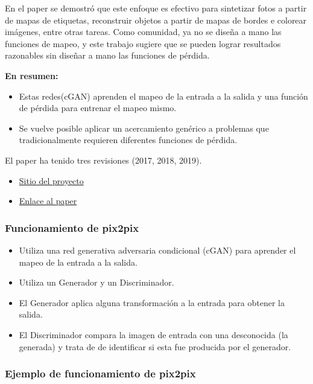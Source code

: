 \documentclass[10pt,journal,compsoc]{IEEEtran}\usepackage[T1]{fontenc}                              %
\begin{document}
En el paper se demostró que este enfoque es efectivo para sintetizar
fotos a partir de mapas de etiquetas, reconstruir objetos a partir de
mapas de bordes e colorear imágenes, entre otras tareas. Como comunidad,
ya no se diseña a mano las funciones de mapeo, y este trabajo sugiere
que se pueden lograr resultados razonables sin diseñar a mano las
funciones de pérdida.

\textbf{En resumen:}

\begin{itemize}
\item
  Estas redes(cGAN) aprenden el mapeo de la entrada a la salida y una
  función de pérdida para entrenar el mapeo mismo.
\item
  Se vuelve posible aplicar un acercamiento genérico a problemas que
  tradicionalmente requieren diferentes funciones de pérdida.
\end{itemize}

El paper ha tenido tres revisiones (2017, 2018, 2019).

\begin{itemize}
\item \href{https://phillipi.github.io/pix2pix/}{Sitio del proyecto}
\item \href{https://arxiv.org/abs/1611.07004}{Enlace al paper}
\end{itemize}

\subsubsection{Funcionamiento de pix2pix}

\begin{itemize}
\item
  Utiliza una red generativa adversaria condicional (cGAN) para aprender
  el mapeo de la entrada a la salida.
\item
  Utiliza un Generador y un Discriminador.
\item
  El Generador aplica alguna transformación a la entrada para obtener la
  salida.
\item
  El Discriminador compara la imagen de entrada con una desconocida (la
  generada) y trata de de identificar si esta fue producida por el
  generador.
\end{itemize}

\subsubsection{Ejemplo de funcionamiento de pix2pix}
\end{document}

